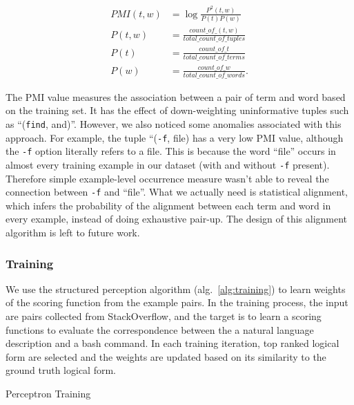 \begin{align}
	PMI(t, w) &= \log{\frac{P^2(t,w)}{P(t)P(w)}} \\
	P(t, w) &= \frac{count\_of\_(t,w)}{total\_count\_of\_tuples} \\
	P(t) &= \frac{count\_of\_t}{total\_count\_of\_terms} \\
	P(w) &= \frac{count\_of\_w}{total\_count\_of\_words}.
\end{align}

The PMI value measures the association between a pair of term and word based on the training set. It has the effect of down-weighting uninformative tuples such as ``(\texttt{find}, and)''. However, we also noticed some anomalies associated with this approach. For example, the tuple ``(\texttt{-f}, file) has a very low PMI value, although the \texttt{-f} option literally refers to a file. This is because the word ``file'' occurs in almost every training example in our dataset (with and without \texttt{-f} present). Therefore simple example-level occurrence measure wasn't able to reveal the connection between \texttt{-f} and ``file''. What we actually need is statistical alignment, which infers the probability of the alignment between each term and word in every example, instead of doing exhaustive pair-up. The design of this alignment algorithm is left to future work. 

\subsubsection{Training}
\label{subsec:training}

We use the structured perception algorithm (alg.~\ref{alg:training}) to learn weights of the scoring function from the example pairs. In the training process, the input are pairs collected from StackOverflow, and the target is to learn a scoring functions to evaluate the correspondence between the a natural language description and a bash command. In each training iteration, top ranked logical form are selected and the weights are updated based on its similarity to the ground truth logical form. 

\begin{algorithm} 
\caption{Perceptron Training\label{alg:training}}
\end{algorithm}
